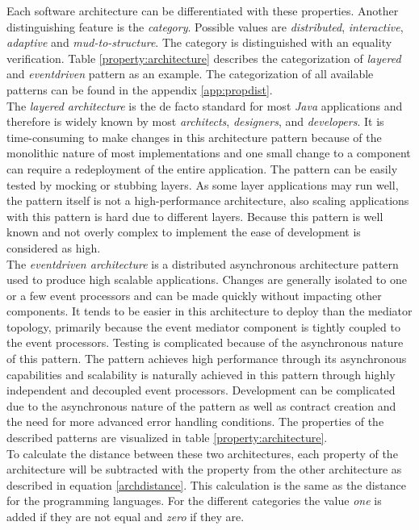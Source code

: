 Each software architecture can be differentiated with these properties. Another distinguishing feature is the \textit{category}. Possible values are \textit{distributed}, \textit{interactive}, \textit{adaptive} and \textit{mud-to-structure}. The category is distinguished with an equality verification. Table \ref{property:architecture} describes the categorization of \textit{layered} and \textit{eventdriven} pattern as an example. The categorization of all available patterns can be found in the appendix \ref{app:propdist}.\\
The \textit{layered architecture} is the de facto standard for most \textit{Java} applications and therefore is widely known by most \textit{architects}, \textit{designers}, and \textit{developers}. It is time-consuming to make changes in this architecture pattern because of the monolithic nature of most implementations and one small change to a component can require a redeployment of the entire application. The pattern can be easily tested by mocking or stubbing layers. As some layer applications may run well, the pattern itself is not a high-performance architecture, also scaling applications with this pattern is hard due to different layers. Because this pattern is well known and not overly complex to implement the ease of development is considered as high.\\
The \textit{eventdriven architecture} is a distributed asynchronous architecture pattern used to produce high scalable applications. Changes are generally isolated to one or a few event processors and can be made quickly without impacting other components. It tends to be easier in this architecture to deploy than the mediator topology, primarily because the event mediator component is tightly coupled to the event processors. Testing is complicated because of the asynchronous nature of this pattern. The pattern achieves high performance through its asynchronous capabilities and scalability is naturally achieved in this pattern through highly independent and decoupled event processors. Development can be complicated due to the asynchronous nature of the pattern as well as contract creation and the need for more advanced error handling conditions. The properties of the described patterns are visualized in table \ref{property:architecture}.\\
To calculate the distance between these two architectures, each property of the architecture will be subtracted with the property from the other architecture as described in equation \ref{archdistance}. This calculation is the same as the distance for the programming languages. For the different categories the value \textit{one} is added if they are not equal and \textit{zero} if they are. 
